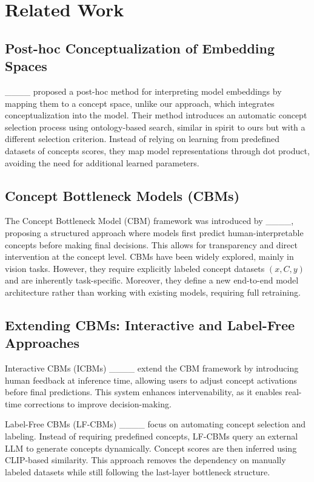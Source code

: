 \section{Related Work}
\subsection{Post-hoc Conceptualization of Embedding Spaces}

____ proposed a post-hoc method for interpreting model embeddings by mapping them to a concept space, unlike our approach, which integrates conceptualization into the model. Their method introduces an automatic concept selection process using ontology-based search, similar in spirit to ours but with a different selection criterion. Instead of relying on learning from predefined datasets of concepts scores, they map model representations through dot product, avoiding the need for additional learned parameters.

\subsection{Concept Bottleneck Models (CBMs)}

The Concept Bottleneck Model (CBM) framework was introduced by ____, proposing a structured approach where models first predict human-interpretable concepts before making final decisions. This allows for transparency and direct intervention at the concept level. CBMs have been widely explored, mainly in vision tasks. However, they require explicitly labeled concept datasets $(x, C, y)$ and are inherently task-specific. Moreover, they define a new end-to-end model architecture rather than working with existing models, requiring full retraining.

\subsection{Extending CBMs: Interactive and Label-Free Approaches}

Interactive CBMs (ICBMs) ____ extend the CBM framework by introducing human feedback at inference time, allowing users to adjust concept activations before final predictions. This system enhances intervenability, as it enables real-time corrections to improve decision-making.

Label-Free CBMs (LF-CBMs) ____ focus on automating concept selection and labeling. Instead of requiring predefined concepts, LF-CBMs query an external LLM to generate concepts dynamically. Concept scores are then inferred using CLIP-based similarity. This approach removes the dependency on manually labeled datasets while still following the last-layer bottleneck structure.

